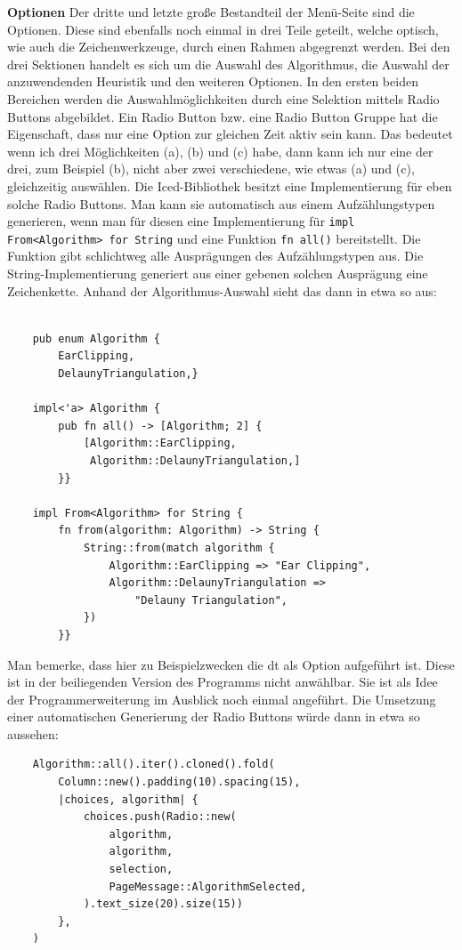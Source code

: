 \textbf{\large{Optionen}}\linebreak
Der dritte und letzte große Bestandteil der Menü-Seite sind die Optionen. Diese sind ebenfalls noch einmal in drei Teile geteilt, welche optisch, wie auch die Zeichenwerkzeuge, durch einen Rahmen 
abgegrenzt werden. Bei den drei Sektionen handelt es sich um die Auswahl des Algorithmus, die Auswahl der anzuwendenden Heuristik und den weiteren Optionen.
In den ersten beiden Bereichen werden die Auswahlmöglichkeiten durch eine Selektion mittels Radio Buttons abgebildet. Ein Radio Button bzw. eine Radio Button Gruppe hat die Eigenschaft, dass nur eine Option zur gleichen Zeit aktiv sein kann.
Das bedeutet wenn ich drei Möglichkeiten (a), (b) und (c) habe, dann kann ich nur eine der drei, zum Beispiel (b), nicht aber zwei verschiedene, wie etwas (a) und (c), gleichzeitig auswählen.
Die Iced-Bibliothek besitzt eine Implementierung für eben solche Radio Buttons. Man kann sie automatisch aus einem Aufzählungstypen generieren, wenn man für diesen eine Implementierung für \lstinline{impl From<Algorithm> for String} und eine Funktion 
\lstinline{fn all()} bereitstellt. Die Funktion gibt schlichtweg alle Ausprägungen des Aufzählungstypen aus. Die String-Implementierung generiert aus einer gebenen solchen Ausprägung eine Zeichenkette.
Anhand der Algorithmus-Auswahl sieht das dann in etwa so aus:

\begin{lstlisting}

    pub enum Algorithm {
        EarClipping,
        DelaunyTriangulation,}

    impl<'a> Algorithm {
        pub fn all() -> [Algorithm; 2] {
            [Algorithm::EarClipping,
             Algorithm::DelaunyTriangulation,]
        }}

    impl From<Algorithm> for String {
        fn from(algorithm: Algorithm) -> String {
            String::from(match algorithm {
                Algorithm::EarClipping => "Ear Clipping",
                Algorithm::DelaunyTriangulation => 
                    "Delauny Triangulation",
            })
        }}
\end{lstlisting}
Man bemerke, dass hier zu Beispielzwecken die \ac{dt} als Option aufgeführt ist. Diese ist in der beiliegenden Version des Programms nicht anwählbar. Sie 
ist als Idee der Programmerweiterung im Ausblick noch einmal angeführt.
Die Umsetzung einer automatischen Generierung der Radio Buttons würde dann in etwa so aussehen:

\begin{lstlisting}
    Algorithm::all().iter().cloned().fold(
        Column::new().padding(10).spacing(15),
        |choices, algorithm| {
            choices.push(Radio::new(
                algorithm,
                algorithm,
                selection,
                PageMessage::AlgorithmSelected,
            ).text_size(20).size(15))
        },
    )
\end{lstlisting}

